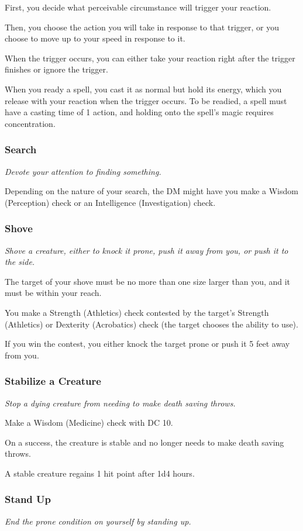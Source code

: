     First, you decide what perceivable circumstance will trigger your reaction.

    Then, you choose the action you will take in response to that trigger, or you choose to move up to your speed in response to it.

    When the trigger occurs, you can either take your reaction right after the trigger finishes or ignore the trigger.

    When you ready a spell, you cast it as normal but hold its energy, which you release with your reaction when the trigger occurs.
    To be readied, a spell must have a casting time of 1 action, and holding onto the spell's magic requires concentration.
\subsubsection{Search}
    \textit{Devote your attention to finding something.}

    Depending on the nature of your search, the DM might have you make a Wisdom (Perception) check or an Intelligence (Investigation) check.
\subsubsection{Shove}
    \textit{Shove a creature, either to knock it prone, push it away from you, or push it to the side.}

    The target of your shove must be no more than one size larger than you, and it must be within your reach.

    You make a Strength (Athletics) check contested by the target's Strength (Athletics) or Dexterity (Acrobatics) check (the target chooses the ability to use).

    If you win the contest, you either knock the target prone or push it 5 feet away from you.
\subsubsection{Stabilize a Creature}
    \textit{Stop a dying creature from needing to make death saving throws.}

    Make a Wisdom (Medicine) check with DC 10.

    On a success, the creature is stable and no longer needs to make death saving throws.

    A stable creature regains 1 hit point after 1d4 hours.
\subsubsection{Stand Up}
    \textit{End the prone condition on yourself by standing up.}
